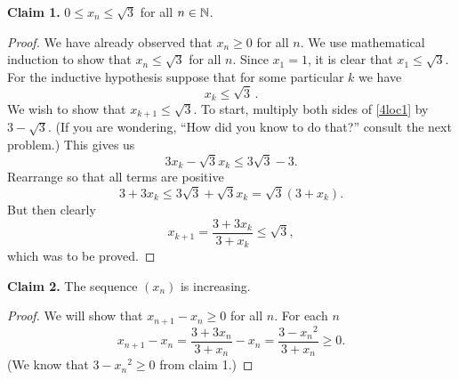\textbf{Claim 1.}  $0 \le x_n \le \sqrt3$ for all $n \in \mathbb{N}$.

\begin{proof} We have already observed that $x_n \ge 0$ for all $n$.  We use mathematical
induction to show that $x_n \le \sqrt3$ for all $n$.  Since $x_1=1$, it is clear that $x_1 \le
\sqrt3$. For the inductive hypothesis suppose that for some particular $k$ we have
  \begin{equation}\label{4loc1} x_k \le \sqrt3\,.
  \end{equation}
We wish to show that $x_{k+1} \le \sqrt3$.  To start, multiply both sides of \eqref{4loc1} by
$3-\sqrt3$.  (If you are wondering, ``How did you know to do that?'' consult the next
problem.)  This gives us
   \[3x_k - \sqrt3 x_k \le 3\sqrt3 - 3.\]
Rearrange so that all terms are positive
   \[3 + 3x_k \le 3\sqrt3 + \sqrt3 x_k = \sqrt3(3 + x_k). \]
But then clearly
   \[x_{k+1} = \frac{3+3x_k}{3+x_k} \le \sqrt3, \]
which was to be proved.  \ns
\end{proof}

\textbf{Claim 2.} The sequence $(x_n)$ is increasing.

\begin{proof} We will show that $x_{n+1} - x_n \ge 0$ for all $n$.  For each $n$
   \[x_{n+1}-x_n = \frac{3+3x_n}{3+x_n} - x_n = \frac{3-{x_n}^2}{3+x_n} \ge 0.\]
(We know that $3-{x_n}^2 \ge 0$ from claim 1.)
\end{proof}

